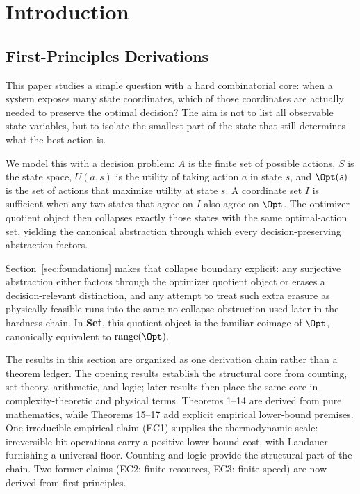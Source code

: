 \section{Introduction}\label{sec:introduction}

\subsection{First-Principles Derivations}\label{sec:intro-first-principles}

This paper studies a simple question with a hard combinatorial core: when a system exposes many state coordinates, which of those coordinates are actually needed to preserve the optimal decision? The aim is not to list all observable state variables, but to isolate the smallest part of the state that still determines what the best action is.

We model this with a decision problem: $A$ is the finite set of possible actions, $S$ is the state space, $U(a,s)$ is the utility of taking action $a$ in state $s$, and $\Opt(s)$ is the set of actions that maximize utility at state $s$. A coordinate set $I$ is sufficient when any two states that agree on $I$ also agree on $\Opt$. The optimizer quotient object then collapses exactly those states with the same optimal-action set, yielding the canonical abstraction through which every decision-preserving abstraction factors.

Section~\ref{sec:foundations} makes that collapse boundary explicit: any surjective abstraction either factors through the optimizer quotient object or erases a decision-relevant distinction, and any attempt to treat such extra erasure as physically feasible runs into the same no-collapse obstruction used later in the hardness chain. In \textbf{Set}, this quotient object is the familiar coimage of $\Opt$, canonically equivalent to $\operatorname{range}(\Opt)$.

The results in this section are organized as one derivation chain rather than a theorem ledger. The opening results establish the structural core from counting, set theory, arithmetic, and logic; later results then place the same core in complexity-theoretic and physical terms. Theorems 1--14 are derived from pure mathematics, while Theorems 15--17 add explicit empirical lower-bound premises. One irreducible empirical claim (EC1) supplies the thermodynamic scale: irreversible bit operations carry a positive lower-bound cost, with Landauer furnishing a universal floor. Counting and logic provide the structural part of the chain. Two former claims (EC2: finite resources, EC3: finite speed) are now derived from first principles.

